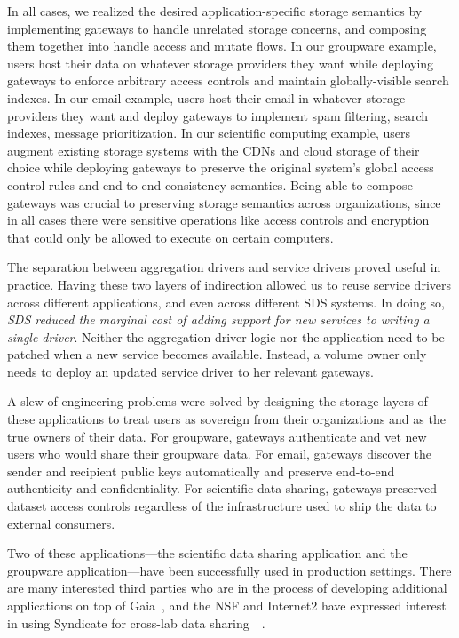 In all cases, we realized the desired application-specific storage semantics by
implementing gateways to handle unrelated storage concerns, and composing them
together into handle access and mutate flows.
In our groupware example, users host their data on whatever storage providers they want
while deploying gateways to enforce arbitrary access controls and maintain globally-visible search
indexes.  In our email example, users host
their email in whatever storage providers they want and deploy gateways to
implement spam filtering, search indexes, message prioritization.  In our scientific
computing example, users augment existing storage systems with the CDNs and cloud
storage of their choice while deploying gateways to preserve the original system's global access
control rules and end-to-end consistency semantics.  Being able to compose
gateways was crucial to preserving storage semantics across organizations, since
in all cases there were sensitive operations like access controls and encryption
that could only be allowed to execute on certain computers.

The separation between aggregation drivers and service drivers proved useful in
practice.  Having these two layers of indirection allowed us to reuse service
drivers across different applications, and even across different SDS systems.
In doing so, \emph{SDS reduced the marginal cost of adding support for new
services to writing a single driver}.
Neither the aggregation driver logic nor the application need to be
patched when a new service becomes available.  Instead, a volume owner only
needs to deploy an updated service driver to her relevant gateways.

A slew of engineering problems were solved by
designing the storage layers of these applications to treat users as sovereign
from their organizations and as the true owners of their data.
For groupware, gateways authenticate and vet new users who would
share their groupware data.  For email, gateways discover the
sender and recipient public keys automatically and preserve end-to-end
authenticity and confidentiality.  For scientific data sharing,
gateways preserved dataset access controls regardless of the infrastructure used
to ship the data to external consumers.

Two of these applications---the scientific data sharing application and the
groupware application---have been successfully used in production settings.
There are many interested third parties who are in the process of developing
additional applications on top of Gaia~\cite{blockstack-app-fund}, and the NSF
and Internet2 have expressed interest in using Syndicate for cross-lab data
sharing~\cite{nsf-grant}~\cite{conversation-internet2}.
